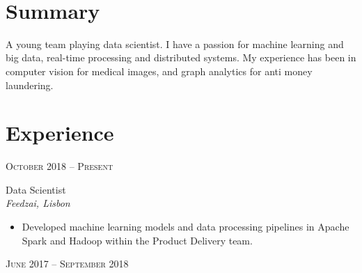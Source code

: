 \documentclass[10pt]{article}
\begin{document}
\color{text1} %


\par{\\[4pt]
\par{

\vspace{10pt}


\begin{minipage}[t]{0.5\textwidth} %
\vspace{0pt} %

\section{Summary}

A young team playing data scientist. I have a passion for machine learning and big data, real-time processing and distributed systems. My experience has been in computer vision for medical images, and graph analytics for anti money laundering.\\[10pt]

\section{Experience}

{\raggedleft\textsc{October 2018 -- \textsc{Present}}\par}

{\raggedright\large Data Scientist\\
\textit{Feedzai, Lisbon}\\[5pt]}

\begin{itemize}
  \item Developed machine learning models and data processing pipelines in Apache Spark and Hadoop within the Product Delivery team.
\end{itemize}

{\raggedleft\textsc{June 2017 -- \textsc{September 2018}}\par}


\end{minipage}}}
\end{document}
